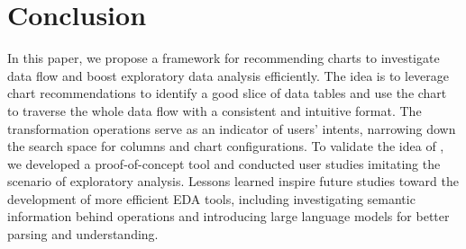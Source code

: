 \section{Conclusion}
In this paper, we propose a framework for recommending charts to investigate data flow and boost exploratory data analysis efficiently.
The idea is to leverage chart recommendations to identify a good slice of data tables and use the chart to traverse the whole data flow with a consistent and intuitive format.
The transformation operations serve as an indicator of users' intents, narrowing down the search space for columns and chart configurations.
To validate the idea of \system{}, we developed a proof-of-concept tool and conducted user studies imitating the scenario of exploratory analysis.
Lessons learned inspire future studies toward the development of more efficient EDA tools, including investigating semantic information behind operations and introducing large language models for better parsing and understanding.